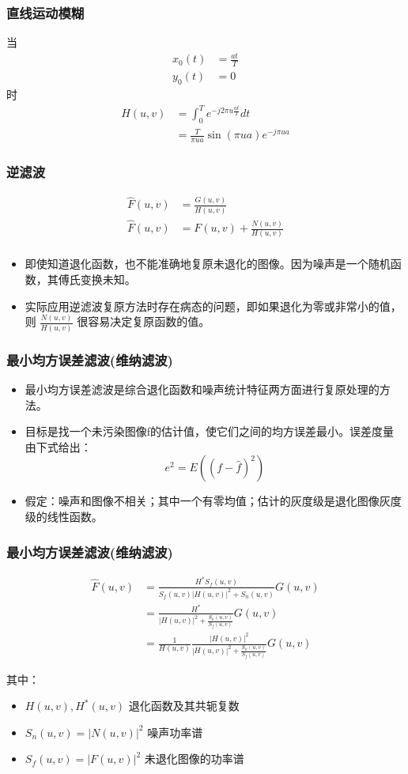 \documentclass{beamer}
\begin{document}
\begin{frame}
\frametitle{直线运动模糊}
\label{sec-9-10}

当
\begin{align*}
x_0(t) &=\frac{at}{T} \\
y_0(t) &=0
\end{align*}
时
\begin{align*}
H(u,v) &=\int_0^T e^{-j2\pi u \frac{at}{T}} dt \\
&=\frac{T}{\pi u a} \sin(\pi u a) e^{-j\pi u a}
\end{align*}
\end{frame}
\begin{frame}
\frametitle{逆滤波}
\label{sec-9-11}


\begin{align*}
 \hat F(u,v) &= \frac{G(u,v)}{H(u,v)} \\
 \hat F(u,v) &= F(u,v)+\frac{N(u,v)}{H(u,v)} \\
\end{align*}

\begin{itemize}
\item 即使知道退化函数，也不能准确地复原未退化的图像。因为噪声是一个随机函数，其傅氏变换未知。
\item 实际应用逆滤波复原方法时存在病态的问题，即如果退化为零或非常小的值，则 $\frac{N(u,v)}{H(u,v)}$ 很容易决定复原函数的值。
\end{itemize}
\end{frame}
\begin{frame}
\frametitle{最小均方误差滤波(维纳滤波)}
\label{sec-9-12}

\begin{itemize}
\item 最小均方误差滤波是综合退化函数和噪声统计特征两方面进行复原处理的方法。
\item 目标是找一个未污染图像f的估计值，使它们之间的均方误差最小。误差度量由下式给出：
  \[ e^2 = E((f-\hat f)^2) \]
\item 假定：噪声和图像不相关；其中一个有零均值；估计的灰度级是退化图像灰度级的线性函数。
\end{itemize}
\end{frame}
\begin{frame}
\frametitle{最小均方误差滤波(维纳滤波)}
\label{sec-9-13}


\begin{align*}
\hat F(u,v) &= \frac{H^{* } S_f(u,v)}{S_f(u,v)|H(u,v)|^2+S_n(u,v)}G(u,v) \\
&= \frac{H^{* } }{|H(u,v)|^2+\frac{S_n(u,v)}{S_f(u,v)}}G(u,v) \\
&= \frac{1}{H(u,v)}\frac{|H(u,v)|^2 }{|H(u,v)|^2+\frac{S_n(u,v)}{S_f(u,v)}}G(u,v)
\end{align*}

其中：
\begin{itemize}
\item $H(u,v),H^{*}(u,v)$ 退化函数及其共轭复数
\item $S_n(u,v)=|N(u,v)|^2$ 噪声功率谱
\item $S_f(u,v)=|F(u,v)|^2$ 未退化图像的功率谱
\end{itemize}
\end{frame}
\end{document}
